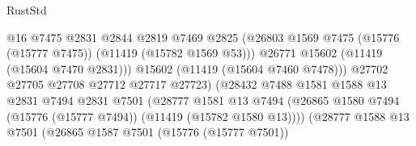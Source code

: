 \begin{lexlean}{RustStd}
\begin{coremodule}
                                              @16
                                              @7475
                                              @2831
                                              @2844
                                              @2819
                                              @7469
                                              @2825
                                              (@26803
                                                @1569
                                                @7475
                                                (@15776 (@15777 @7475))
                                                (@11419 (@15782 @1569 @53)))
                                              @26771
                                              @15602
                                              (@11419 (@15604 @7470 @2831)))
                                            @15602
                                            (@11419 (@15604 @7460 @7478)))
                                          @27702
                                          @27705
                                          @27708
                                          @27712
                                          @27717
                                          @27723)
                                        (@28432
                                          @7488
                                          @1581
                                          @1588
                                          @13
                                          @2831
                                          @7494
                                          @2831
                                          @7501
                                          (@28777
                                            @1581
                                            @13
                                            @7494
                                            (@26865
                                              @1580
                                              @7494
                                              (@15776 (@15777 @7494))
                                              (@11419 (@15782 @1580 @13))))
                                          (@28777
                                            @1588
                                            @13
                                            @7501
                                            (@26865
                                              @1587
                                              @7501
                                              (@15776 (@15777 @7501))

\end{coremodule}
\end{lexlean}

